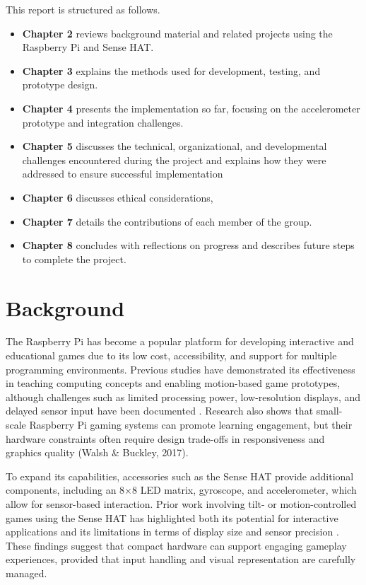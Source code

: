 \documentclass[12pt]{report}
\begin{document}
\label{sec:thesis-outline}

This report is structured as follows.

\begin{itemize}
    \item \textbf{Chapter 2} reviews background material and related projects using the Raspberry Pi and Sense HAT.
    \item \textbf{Chapter 3} explains the methods used for development, testing, and prototype design.
    \item \textbf{Chapter 4} presents the implementation so far, focusing on the accelerometer prototype and integration challenges.
    \item \textbf{Chapter 5} discusses the technical, organizational, and developmental challenges encountered during the project and explains how they were addressed to ensure successful implementation
    \item \textbf{Chapter 6} discusses ethical considerations,
    \item \textbf{Chapter 7} details the contributions of each member of the group.
    \item \textbf{Chapter 8} concludes with reflections on progress and describes future steps to complete the project.
\end{itemize}
\chapter{Background}
\label{cha:background}

The Raspberry Pi has become a popular platform for developing interactive and educational games due to its low cost, accessibility, and support for multiple programming environments. Previous studies have demonstrated its effectiveness in teaching computing concepts and enabling motion-based game prototypes, although challenges such as limited processing power, low-resolution displays, and delayed sensor input have been documented \cite{Kolling2016}. Research also shows that small-scale Raspberry Pi gaming systems can promote learning engagement, but their hardware constraints often require design trade-offs in responsiveness and graphics quality (Walsh \& Buckley, 2017).

To expand its capabilities, accessories such as the Sense HAT provide additional components, including an 8×8 LED matrix, gyroscope, and accelerometer, which allow for sensor-based interaction. Prior work involving tilt- or motion-controlled games using the Sense HAT has highlighted both its potential for interactive applications and its limitations in terms of display size and sensor precision \cite{Saha2016}. These findings suggest that compact hardware can support engaging gameplay experiences, provided that input handling and visual representation are carefully managed.
\end{document}

